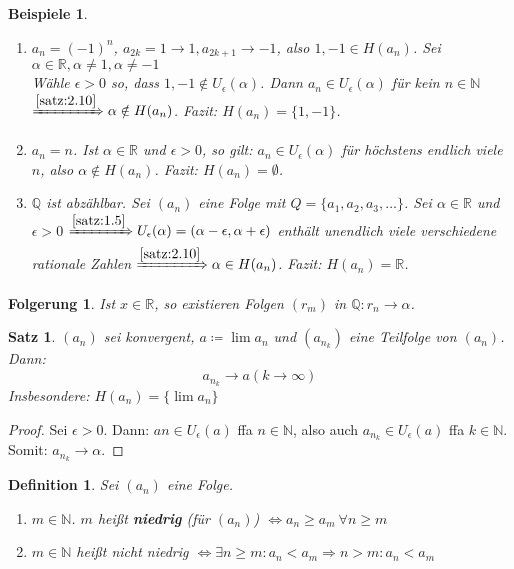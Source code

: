 \documentclass[titlepage,ngerman,a4paper,headsepline,DIV15,halfparskip*,14pt]{scrartcl}
\newcommand{\R}{\mathbb{R}}
\newcommand{\N}{\mathbb{N}}
\newcommand{\Q}{\mathbb{Q}}
\theoremstyle{dotless}
\newtheorem{satz}{Satz}[section]
\newtheorem*{definition}{Definition}
\newtheorem*{beispiele}{Beispiele}
\newtheorem*{folgerung}{Folgerung}
\begin{document}
\begin{beispiele}\
	\begin{enumerate}
		\item $a_{n} = (-1)^{n}$, $a_{2k} = 1 \rightarrow 1, a_{2k+1} \rightarrow -1$, also $1, -1 \in H(a_{n})$. Sei $\alpha \in \R, \alpha \neq 1, \alpha \neq -1$ \\
			Wähle $\epsilon>0$ so, dass $1, -1 \notin U_{\epsilon}(\alpha)$. Dann $a_{n} \in U_{\epsilon}(\alpha)$ für kein $n \in \N$ $\xRightarrow[]{\ref{satz:2.10}} \alpha \notin H(a_{n})$. Fazit: $H(a_{n}) = \{ 1, -1 \}$.
		\item $a_{n} = n$. Ist $\alpha \in \R$ und $\epsilon > 0$, so gilt: $a_{n} \in U_{\epsilon}(\alpha)$ für höchstens endlich viele $n$, also $\alpha \notin H(a_{n})$. Fazit: $H(a_{n}) = \emptyset$.
		\item $\Q$ ist abzählbar. Sei $(a_{n})$ eine Folge mit $Q = \{ a_{1}, a_{2}, a_{3}, \dotsc \}$. Sei $\alpha \in \R$ und $\epsilon > 0$ $\xRightarrow[]{\ref{satz:1.5}} U_{\epsilon}(\alpha) = (\alpha - \epsilon, \alpha + \epsilon)$ enthält unendlich viele verschiedene rationale Zahlen $\xRightarrow[]{\ref{satz:2.10}} \alpha \in H(a_{n})$. Fazit: $H(a_{n}) = \R$.
	\end{enumerate}	
\end{beispiele}

\begin{folgerung}
Ist $x \in \R$, so existieren Folgen $(r_{m})$ in $\Q : r_{n} \rightarrow \alpha$.	
\end{folgerung}


\begin{satz} \label{satz:2.11} 
	$(a_{n})$ sei konvergent, $a \coloneqq \lim a_{n}$ und $(a_{n_{k}})$ eine Teilfolge von $(a_{n})$. Dann:
	$$ a_{n_{k}} \rightarrow a (k \rightarrow \infty) $$
	Insbesondere: $H(a_{n}) = \{ \lim a_{n} \}$
\end{satz}

\begin{proof}
	Sei $\epsilon > 0$. Dann: $a{n} \in U_{\epsilon}(a)$ ffa $n \in \N$, also auch $a_{n_{k}} \in U_{\epsilon}(a)$ ffa $k \in \N$. Somit: $a_{n_{k}} \rightarrow \alpha$.
\end{proof}

\begin{definition} Sei $(a_{n})$ eine Folge. 
	\begin{enumerate}
		\item $m \in \N$. $m$ hei{\ss}t \textbf{niedrig} (für $(a_{n})$) $\iff a_{n} \geq a_{m} ~\forall n \geq m $
		\item $m \in \N$ hei{\ss}t nicht niedrig $\iff \exists n \geq m: a_{n} < a_{m} \Rightarrow n > m: a_{n} < a_{m}$
	\end{enumerate}
\end{definition}
\end{document}
